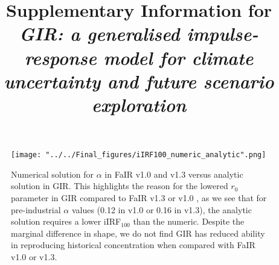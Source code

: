 \documentclass[gmd, manuscript]{copernicus}
\begin{document}
\title{Supplementary Information for \emph{GIR: a generalised impulse-response model for climate uncertainty and future scenario exploration}}















\received{}
\pubdiscuss{} %
\revised{}
\accepted{}
\published{}




\maketitle

\begin{figure}[t]
    \texttt{[image: "../../Final\_figures/iIRF100\_numeric\_analytic".png]}
    \caption{Numerical solution for $\alpha$ in FaIR v1.0 and v1.3 versus analytic solution in GIR. This highlights the reason for the lowered $r_0$ parameter in GIR compared to FaIR v1.3 \citep{Smith2017} or v1.0 \citep{Millar2016}, as we see that for pre-industrial $\alpha$ values (0.12 in v1.0 or 0.16 in v1.3), the analytic solution requires a lower iIRF$_{100}$ than the numeric. Despite the marginal difference in shape, we do not find GIR has reduced ability in reproducing historical concentration when compared with FaIR v1.0 or v1.3.}
\end{figure}
\end{document}
